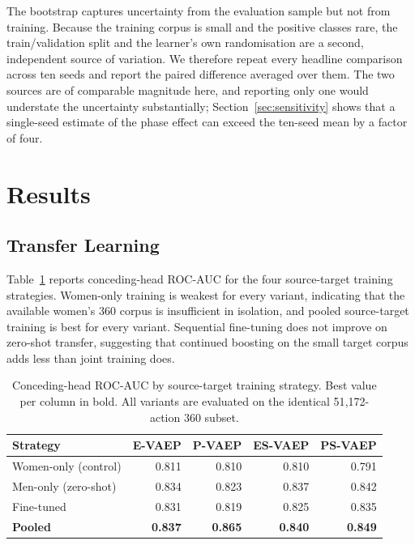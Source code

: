 \documentclass[runningheads]{llncs}
\begin{document}
The bootstrap captures uncertainty from the evaluation sample but not from training. Because the training corpus is small and the positive classes rare, the train/validation split and the learner's own randomisation are a second, independent source of variation. We therefore repeat every headline comparison across ten seeds and report the paired difference averaged over them. The two sources are of comparable magnitude here, and reporting only one would understate the uncertainty substantially; Section~\ref{sec:sensitivity} shows that a single-seed estimate of the phase effect can exceed the ten-seed mean by a factor of four.

\section{Results}

\subsection{Transfer Learning}
\label{sec:transfer}

Table~\ref{tab:transfer} reports conceding-head ROC-AUC for the four source-target training strategies. Women-only training is weakest for every variant, indicating that the available women's 360 corpus is insufficient in isolation, and pooled source-target training is best for every variant. Sequential fine-tuning does not improve on zero-shot transfer, suggesting that continued boosting on the small target corpus adds less than joint training does.

\begin{table}[tbp]
\footnotesize
\centering
\caption{Conceding-head ROC-AUC by source-target training strategy. Best value per column in bold. All variants are evaluated on the identical 51{,}172-action 360 subset.}
\label{tab:transfer}
\begin{tabular}{lrrrr}
\toprule
\textbf{Strategy} & \textbf{E-VAEP} & \textbf{P-VAEP} & \textbf{ES-VAEP} & \textbf{PS-VAEP} \\
\midrule
Women-only (control) & 0.811 & 0.810 & 0.810 & 0.791 \\
Men-only (zero-shot) & 0.834 & 0.823 & 0.837 & 0.842 \\
Fine-tuned & 0.831 & 0.819 & 0.825 & 0.835 \\
\textbf{Pooled} & \textbf{0.837} & \textbf{0.865} & \textbf{0.840} & \textbf{0.849} \\
\bottomrule
\end{tabular}
\end{table}
\end{document}
